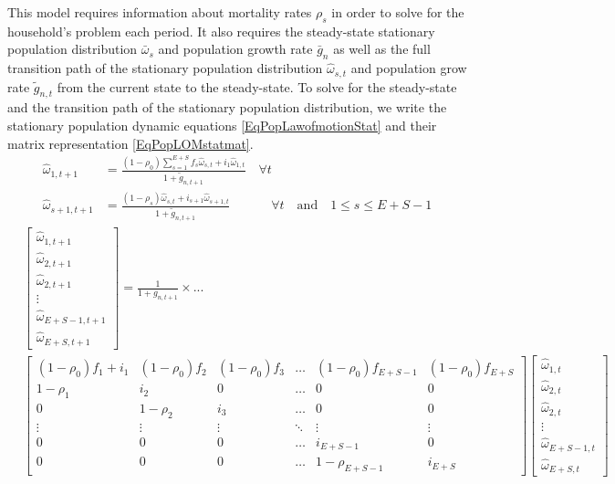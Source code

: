   This model requires information about mortality rates $\rho_s$ in order to solve for the household's problem each period. It also requires the steady-state stationary population distribution $\bar{\omega}_{s}$ and population growth rate $\bar{g}_n$ as well as the full transition path of the stationary population distribution $\hat{\omega}_{s,t}$ and population grow rate $\tilde{g}_{n,t}$ from the current state to the steady-state. To solve for the steady-state and the transition path of the stationary population distribution, we write the stationary population dynamic equations \eqref{EqPopLawofmotionStat} and their matrix representation \eqref{EqPopLOMstatmat}.
  \begin{equation}\label{EqPopLawofmotionStat}
    \begin{split}
      \hat{\omega}_{1,t+1} &= \frac{(1-\rho_0)\sum_{s=1}^{E+S} f_s\hat{\omega}_{s,t} + i_1\hat{\omega}_{1,t}}{1+\tilde{g}_{n,t+1}}\quad\forall t \\
      \hat{\omega}_{s+1,t+1} &= \frac{(1 - \rho_s)\hat{\omega}_{s,t} + i_{s+1}\hat{\omega}_{s+1,t}}{1+\tilde{g}_{n,t+1}}\qquad\quad\:\forall t\quad\text{and}\quad 1\leq s \leq E+S-1
    \end{split}
  \end{equation}
  \begin{equation}\label{EqPopLOMstatmat}
    \begin{split}
      & \begin{bmatrix}
        \hat{\omega}_{1,t+1} \\ \hat{\omega}_{2,t+1} \\ \hat{\omega}_{2,t+1} \\ \vdots \\ \hat{\omega}_{E+S-1,t+1} \\ \hat{\omega}_{E+S,t+1}
      \end{bmatrix}= \frac{1}{1 + g_{n,t+1}} \times ... \\
      & \begin{bmatrix}
        (1-\rho_0)f_1+i_1 & (1-\rho_0)f_2 & (1-\rho_0)f_3 & \hdots & (1-\rho_0)f_{E+S-1} & (1-\rho_0)f_{E+S} \\
        1-\rho_1 & i_2 & 0 & \hdots & 0 & 0 \\
        0 & 1-\rho_2 & i_3 & \hdots & 0 & 0 \\
        \vdots & \vdots & \vdots & \ddots & \vdots & \vdots \\
        0 & 0 & 0 & \hdots & i_{E+S-1} & 0 \\
        0 & 0 & 0 & \hdots & 1-\rho_{E+S-1} & i_{E+S}
      \end{bmatrix}
      \begin{bmatrix}
        \hat{\omega}_{1,t} \\ \hat{\omega}_{2,t} \\ \hat{\omega}_{2,t} \\ \vdots \\ \hat{\omega}_{E+S-1,t} \\ \hat{\omega}_{E+S,t}
      \end{bmatrix}
    \end{split}
  \end{equation}
